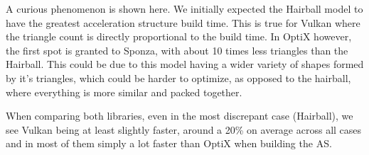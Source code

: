 A curious phenomenon is shown here. We initially expected the Hairball model to have the greatest acceleration structure build time. This is true for Vulkan where the triangle count is directly proportional to the build time. In OptiX however, the first spot is granted to Sponza, with about 10 times less triangles than the Hairball. This could be due to this model having a wider variety of shapes formed by it's triangles, which could be harder to optimize, as opposed to the hairball, where everything is more similar and packed together.

When comparing both libraries, even in the most discrepant case (Hairball), we see Vulkan being at least slightly faster, around a 20\% on average across all cases and in most of them simply a lot faster than OptiX when building the AS.

\begin{figure}
    \\

\end{figure}
